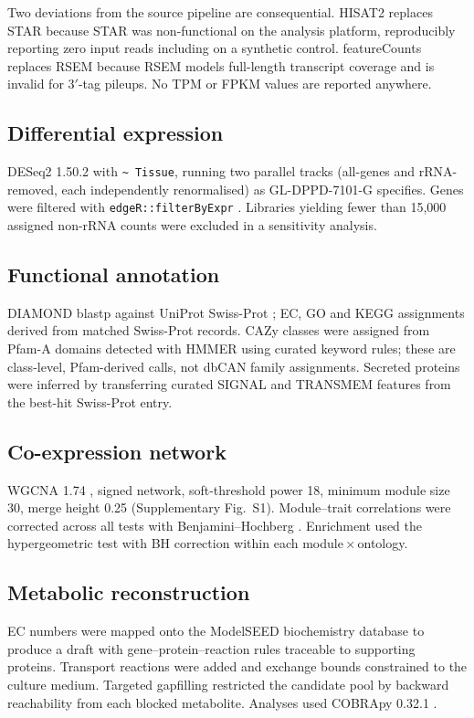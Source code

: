 Two deviations from the source pipeline are consequential. HISAT2 replaces STAR because STAR
was non-functional on the analysis platform, reproducibly reporting zero input reads including
on a synthetic control. featureCounts replaces RSEM because RSEM models full-length transcript
coverage and is invalid for 3$'$-tag pileups. No TPM or FPKM values are reported anywhere.

\subsection{Differential expression}
DESeq2 1.50.2 \cite{love2014deseq2} with \verb|~ Tissue|, running two parallel tracks
(all-genes and rRNA-removed, each independently renormalised) as GL-DPPD-7101-G specifies.
Genes were filtered with \texttt{edgeR::filterByExpr} \cite{robinson2010edger}. Libraries
yielding fewer than 15,000 assigned non-rRNA counts were excluded in a sensitivity analysis.

\subsection{Functional annotation}
DIAMOND \cite{buchfink2015diamond} blastp against UniProt Swiss-Prot \cite{uniprot2023}; EC, GO
and KEGG \cite{kanehisa2000kegg} assignments derived from matched Swiss-Prot records. CAZy
classes were assigned from Pfam-A \cite{mistry2021pfam} domains detected with HMMER
\cite{eddy2011hmmer} using curated keyword rules; these are class-level, Pfam-derived calls,
not dbCAN family assignments. Secreted proteins were inferred by transferring curated SIGNAL
and TRANSMEM features from the best-hit Swiss-Prot entry.

\subsection{Co-expression network}
WGCNA 1.74 \cite{langfelder2008wgcna}, signed network, soft-threshold power 18, minimum module
size 30, merge height 0.25 (Supplementary Fig.~S1). Module--trait correlations were corrected
across all tests with Benjamini--Hochberg \cite{benjamini1995controlling}. Enrichment used the
hypergeometric test with BH correction within each module\,$\times$\,ontology.

\subsection{Metabolic reconstruction}
EC numbers were mapped onto the ModelSEED biochemistry database \cite{seaver2021modelseed} to
produce a draft with gene--protein--reaction rules traceable to supporting proteins. Transport
reactions were added and exchange bounds constrained to the culture medium. Targeted gapfilling
restricted the candidate pool by backward reachability from each blocked metabolite. Analyses
used COBRApy 0.32.1 \cite{ebrahim2013cobrapy}.

